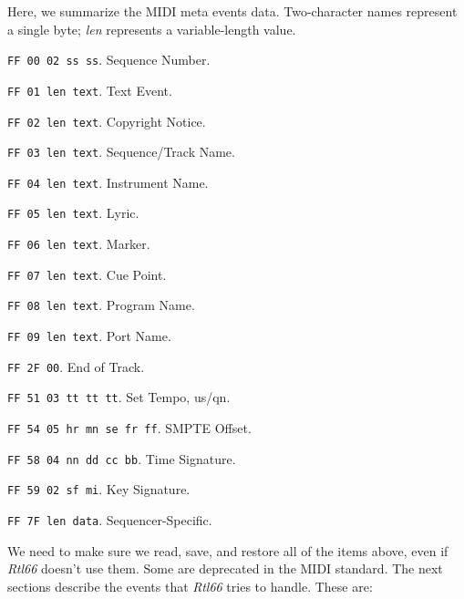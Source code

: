    Here, we summarize the MIDI meta events data.
   Two-character names represent a single byte; \textsl{len}
   represents a variable-length value.

   \begin{enumber}
      \item \texttt{FF 00 02 ss ss}.
         Sequence Number.
      \item \texttt{FF 01 len text}.
         Text Event.
      \item \texttt{FF 02 len text}.
         Copyright Notice.
      \item \texttt{FF 03 len text}.
         Sequence/Track Name.
      \item \texttt{FF 04 len text}.
         Instrument Name.
      \item \texttt{FF 05 len text}.
         Lyric.
      \item \texttt{FF 06 len text}.
         Marker.
      \item \texttt{FF 07 len text}.
         Cue Point.
      \item \texttt{FF 08 len text}.
         Program Name.
      \item \texttt{FF 09 len text}.
         Port Name.
      \item \texttt{FF 2F 00}.
         End of Track.
      \item \texttt{FF 51 03 tt tt tt}.
         Set Tempo, us/qn.
      \item \texttt{FF 54 05 hr mn se fr ff}.
         SMPTE Offset.
      \item \texttt{FF 58 04 nn dd cc bb}.
         Time Signature.
      \item \texttt{FF 59 02 sf mi}.
         Key Signature.
      \item \texttt{FF 7F len data}.
         Sequencer-Specific.
   \end{enumber}

   We need to make sure we read, save, and restore all of the items above,
   even if \textsl{Rtl66} doesn't use them.
   Some are deprecated in the MIDI standard.
   The next sections describe the events that \textsl{Rtl66} tries to
   handle.  These are:

